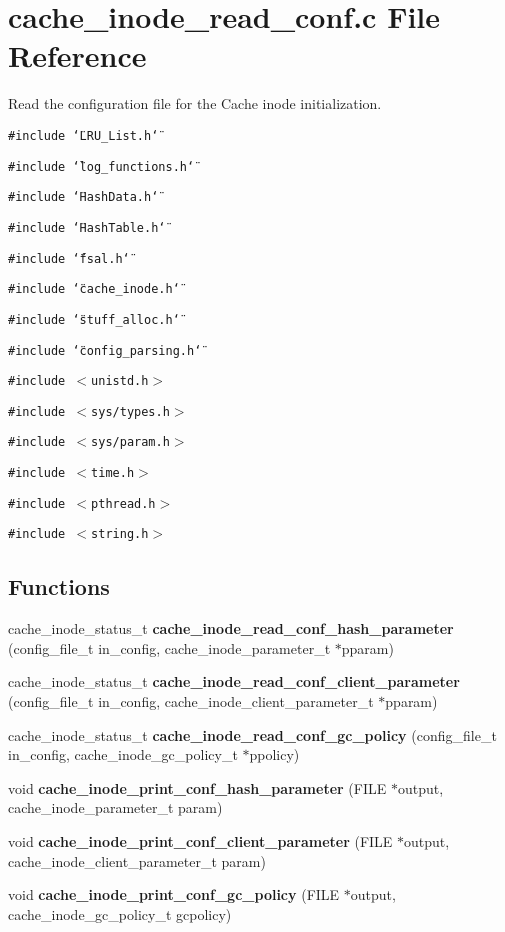 \section{cache\_\-inode\_\-read\_\-conf.c File Reference}
\label{cache__inode__read__conf_8c}
Read the configuration file for the Cache inode initialization. 

{\tt \#include \char`\"{}LRU\_\-List.h\char`\"{}}\par
{\tt \#include \char`\"{}log\_\-functions.h\char`\"{}}\par
{\tt \#include \char`\"{}Hash\-Data.h\char`\"{}}\par
{\tt \#include \char`\"{}Hash\-Table.h\char`\"{}}\par
{\tt \#include \char`\"{}fsal.h\char`\"{}}\par
{\tt \#include \char`\"{}cache\_\-inode.h\char`\"{}}\par
{\tt \#include \char`\"{}stuff\_\-alloc.h\char`\"{}}\par
{\tt \#include \char`\"{}config\_\-parsing.h\char`\"{}}\par
{\tt \#include $<$unistd.h$>$}\par
{\tt \#include $<$sys/types.h$>$}\par
{\tt \#include $<$sys/param.h$>$}\par
{\tt \#include $<$time.h$>$}\par
{\tt \#include $<$pthread.h$>$}\par
{\tt \#include $<$string.h$>$}\par
\subsection*{Functions}
\begin{CompactItemize}
\item 
cache\_\-inode\_\-status\_\-t {\bf cache\_\-inode\_\-read\_\-conf\_\-hash\_\-parameter} (config\_\-file\_\-t in\_\-config, cache\_\-inode\_\-parameter\_\-t $\ast$pparam)
\item 
cache\_\-inode\_\-status\_\-t {\bf cache\_\-inode\_\-read\_\-conf\_\-client\_\-parameter} (config\_\-file\_\-t in\_\-config, cache\_\-inode\_\-client\_\-parameter\_\-t $\ast$pparam)
\item 
cache\_\-inode\_\-status\_\-t {\bf cache\_\-inode\_\-read\_\-conf\_\-gc\_\-policy} (config\_\-file\_\-t in\_\-config, cache\_\-inode\_\-gc\_\-policy\_\-t $\ast$ppolicy)
\item 
void {\bf cache\_\-inode\_\-print\_\-conf\_\-hash\_\-parameter} (FILE $\ast$output, cache\_\-inode\_\-parameter\_\-t param)
\item 
void {\bf cache\_\-inode\_\-print\_\-conf\_\-client\_\-parameter} (FILE $\ast$output, cache\_\-inode\_\-client\_\-parameter\_\-t param)
\item 
void {\bf cache\_\-inode\_\-print\_\-conf\_\-gc\_\-policy} (FILE $\ast$output, cache\_\-inode\_\-gc\_\-policy\_\-t gcpolicy)
\end{CompactItemize}


